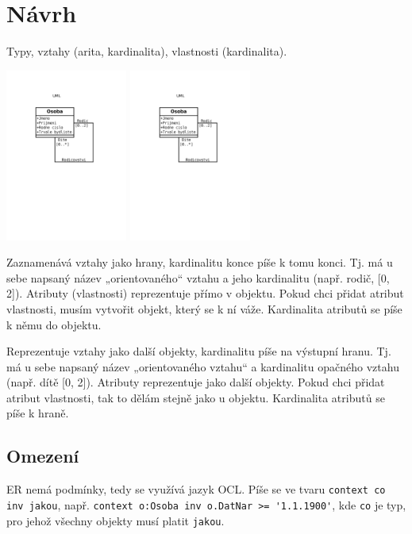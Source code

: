 \documentclass[12pt]{article}					%
\begin{document}
\section{Návrh}
\begin{poznamka}[Co je potřeba]
	Typy, vztahy (arita, kardinalita), vlastnosti (kardinalita).
\end{poznamka}

\begin{center}
	\includegraphics[width=0.3\textwidth]{UMLvsER.pdf}
	\includegraphics[width=0.3\textwidth, page=2]{UMLvsER.pdf}
\end{center}

\begin{definice}[UML]
	Zaznamenává vztahy jako hrany, kardinalitu konce píše k tomu konci. Tj. má u sebe napsaný název „orientovaného“ vztahu a jeho kardinalitu (např. rodič, [0, 2]). Atributy (vlastnosti) reprezentuje přímo v objektu. Pokud chci přidat atribut vlastnosti, musím vytvořit objekt, který se k ní váže. Kardinalita atributů se píše k němu do objektu.
\end{definice}

\begin{definice}[ER]
	Reprezentuje vztahy jako další objekty, kardinalitu píše na výstupní hranu. Tj. má u sebe napsaný název „orientovaného vztahu“ a kardinalitu opačného vztahu (např. dítě [0, 2]). Atributy reprezentuje jako další objekty. Pokud chci přidat atribut vlastnosti, tak to dělám stejně jako u objektu. Kardinalita atributů se píše k hraně.
\end{definice}


	\subsection{Omezení}
	\begin{definice}[OCL]
		ER nemá podmínky, tedy se využívá jazyk OCL. Píše se ve tvaru \verb|context co inv jakou|, např. \verb|context o:Osoba inv o.DatNar >= '1.1.1900'|, kde \verb|co| je typ, pro jehož všechny objekty musí platit \verb|jakou|.
	\end{definice}
\end{document}
